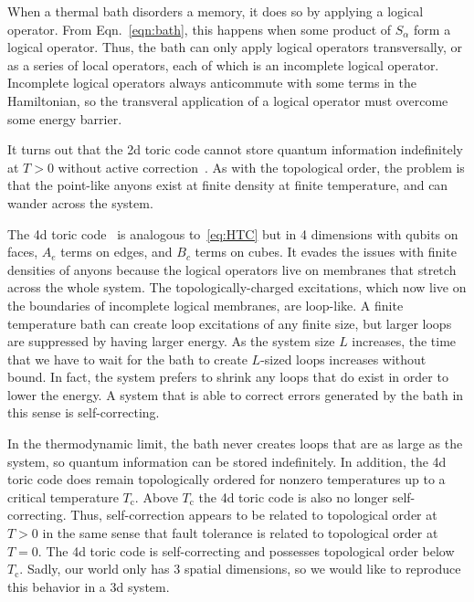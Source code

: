 When a thermal bath disorders a memory, it does so by applying a logical operator. From Eqn.~\ref{eqn:bath}, this happens when some product of $S_\alpha$ form a logical operator. Thus, the bath can only apply logical operators transversally, or as a series of local operators, each of which is an incomplete logical operator. Incomplete logical operators always anticommute with some terms in the Hamiltonian, so the transveral application of a logical operator must overcome some energy barrier. 

It turns out that the 2d toric code cannot store quantum information indefinitely at $T>0$ without active correction~\cite{Dennis2002Topological}. As with the topological order, the problem is that the point-like anyons exist at finite density at finite temperature, and can wander across the system.

The 4d toric code~\cite{Dennis2002Topological} is analogous to~\eqref{eq:HTC} but in 4 dimensions with qubits on faces, $A_e$ terms on edges, and $B_c$ terms on cubes. 
It evades the issues with finite densities of anyons because the logical operators live on membranes that stretch across the whole system. The topologically-charged excitations, which now live on the boundaries of incomplete logical membranes, are loop-like. A finite temperature bath can create loop excitations of any finite size, but larger loops are suppressed by having larger energy. As the system size $L$ increases, the time that we have to wait for the bath to create $L$-sized loops increases without bound. In fact, the system prefers to shrink any loops that do exist in order to lower the energy. A system that is able to correct errors generated by the bath in this sense is  self-correcting.

In the thermodynamic limit, the bath never creates loops that are as large as the system, so quantum information can be stored indefinitely. In addition, the 4d toric code does remain topologically ordered for nonzero temperatures up to a critical temperature $T_\text{c}$. Above $T_\text{c}$ the 4d toric code is also no longer self-correcting. Thus, self-correction appears to be related to topological order at $T>0$ in the same sense that fault tolerance is related to topological order at $T=0$. The 4d toric code is self-correcting and possesses topological order below $T_\text{c}$. 
Sadly, our world only has 3 spatial dimensions, so we would like to reproduce this behavior in a 3d system.

